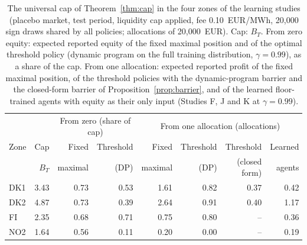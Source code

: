 \begin{table}[!htbp]
\centering
\caption{The universal cap of Theorem~\ref{thm:cap} in the four zones of the learning studies (placebo market, test period, liquidity cap applied, fee 0.10~EUR/MWh, 20,000 sign draws shared by all policies; allocations of 20,000~EUR). Cap: $B_T$. From zero equity: expected reported equity of the fixed maximal position and of the optimal threshold policy (dynamic program on the full training distribution, $\gamma = 0.99$), as a share of the cap. From one allocation: expected reported profit of the fixed maximal position, of the threshold policies with the dynamic-program barrier and the closed-form barrier of Proposition~\ref{prop:barrier}, and of the learned floor-trained agents with equity as their only input (Studies F, J and K at $\gamma = 0.99$).}
\label{tab:cap}
\scriptsize
\setlength{\tabcolsep}{3pt}
\begin{tabular}{@{}lrrrrrrr@{}}
\toprule
 & & \multicolumn{2}{c}{From zero (share of cap)} & \multicolumn{4}{c}{From one allocation (allocations)} \\
\cmidrule(lr){3-4}\cmidrule(lr){5-8}
Zone & Cap & Fixed & Threshold & Fixed & Threshold & Threshold & Learned \\
 & $B_T$ & maximal & (DP) & maximal & (DP) & (closed form) & agents \\
\midrule
DK1 & 3.43 & 0.73 & 0.53 & 1.61 & 0.82 & 0.37 & 0.42 \\
DK2 & 4.87 & 0.73 & 0.39 & 2.64 & 0.91 & 0.40 & 1.17 \\
FI & 2.35 & 0.68 & 0.71 & 0.75 & 0.80 & -- & 0.36 \\
NO2 & 1.64 & 0.56 & 0.11 & 0.20 & 0.00 & -- & 0.19 \\
\bottomrule
\end{tabular}
\end{table}
